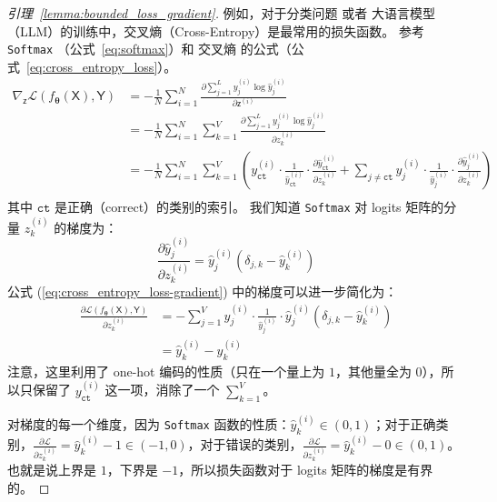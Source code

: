 \documentclass[citestyle=gb7714-2015, bibstyle=gb7714-2015,lang=cn,14pt,scheme=chinese]{elegantbook}
\begin{document}
\begin{proof}[引理~\ref{lemma:bounded_loss_gradient}]
    例如，对于分类问题 或者 大语言模型（LLM）的训练中，交叉熵（Cross-Entropy）是最常用的损失函数。
参考 \texttt{Softmax} （公式~\ref{eq:softmax}）和 交叉熵 的公式（公式~\ref{eq:cross_entropy_loss}）。
\begin{equation}\label{eq:cross_entropy_loss-gradient}
\begin{aligned}
\nabla_{\bm{\mathsf{z}}} \mathcal{L} \left( f_{\bm{\theta}} \left( \bm{\mathsf{X}} \right), \bm{\mathsf{Y}} \right) &= - \frac{1}{N} \sum_{i=1}^{N} \frac{\partial \sum_{j=1}^{L} y^{(i)}_{j} \log \hat{y}^{(i)}_{j} }{\partial \bm{\mathsf{z}}^{(i)}} \\
    &= - \frac{1}{N} \sum_{i=1}^{N} \sum_{k=1}^{V} \frac{\partial \sum_{j=1}^{L} y^{(i)}_{j} \log \hat{y}^{(i)}_{j} }{\partial z^{(i)}_{k}} \\
    &= - \frac{1}{N} \sum_{i=1}^{N} \sum_{k=1}^{V} \left( y^{(i)}_{\texttt{ct}} \cdot \frac{1}{\hat{y}^{(i)}_{\texttt{ct}}} \cdot \frac{\partial \hat{y}^{(i)}_{\texttt{ct}}}{\partial z^{(i)}_{k}} + \sum_{j \neq \texttt{ct}} y^{(i)}_{j} \cdot \frac{1}{\hat{y}^{(i)}_{j}} \cdot \frac{\partial \hat{y}^{(i)}_{j}}{\partial z^{(i)}_{k}} \right) \\
\end{aligned}
\end{equation}
其中 \(\texttt{ct}\) 是正确（correct）的类别的索引。
我们知道 \texttt{Softmax} 对 logits 矩阵的分量 \(z^{(i)}_{k}\) 的梯度为：
\[
    \frac{\partial \hat{y}^{(i)}_{j}}{\partial z^{(i)}_{k}} = \hat{y}^{(i)}_{j} \left( \delta_{j,k} - \hat{y}^{(i)}_{k} \right)
\]
公式 (\ref{eq:cross_entropy_loss-gradient}) 中的梯度可以进一步简化为：
\begin{equation}\label{eq:cross_entropy_loss-gradient_simplified}
\begin{aligned}
\frac{\partial \mathcal{L} \left( f_{\bm{\theta}} \left( \bm{\mathsf{X}} \right), \bm{\mathsf{Y}} \right)}{\partial z_{k}^{(i)}}  &= - \sum_{j=1}^{V} y^{(i)}_{j} \cdot \frac{1}{\hat{y}^{(i)}_{j}} \cdot \hat{y}^{(i)}_{j} \left( \delta_{j,k} - \hat{y}^{(i)}_{k} \right) \\
&= \hat{y}^{(i)}_{k} - y^{(i)}_{k}
\end{aligned}
\end{equation}
注意，这里利用了 one-hot 编码的性质（只在一个量上为 \(1\)，其他量全为 \(0\)），所以只保留了 \(y^{(i)}_{\texttt{ct}}\) 这一项，消除了一个 \(\sum_{k=1}^{V}\)。

对梯度的每一个维度，因为 \texttt{Softmax} 函数的性质：\(\hat{y}^{(i)}_{k} \in \left( 0, 1 \right)\)；对于正确类别，\(\frac{\partial \mathcal{L}}{\partial z_{k}^{(i)}} = \hat{y}^{(i)}_{k} - 1 \in \left(-1, 0\right)\)，对于错误的类别，\(\frac{\partial \mathcal{L}}{\partial z_{k}^{(i)}} = \hat{y}^{(i)}_{k} - 0 \in \left( 0, 1 \right)\)。
也就是说上界是 \(1\)，下界是 \(- 1\)，所以损失函数对于 logits 矩阵的梯度是有界的。
\end{proof}
\end{document}
